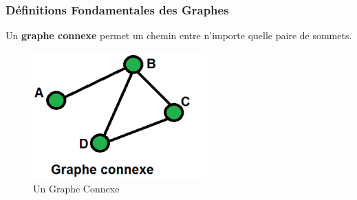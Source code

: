 \begin{frame}
\frametitle{Définitions Fondamentales des Graphes}

\begin{tcolorbox}[colback=orange!10,colframe=orange!100!black,
    title=Un graphe connexe]
    Un \textbf{graphe connexe} permet un chemin entre n'importe quelle paire de sommets.
\end{tcolorbox}

\begin{figure}[H]
    \centering
    \includegraphics[width=0.5 \textwidth]{Figures/Graphe Connexe.PNG}
    \caption{Un Graphe Connexe}
    \label{fig:Un Graphe Connexe}
\end{figure}

\end{frame}


